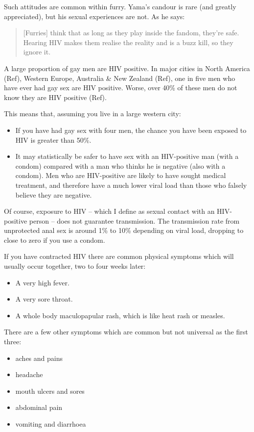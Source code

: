 Such attitudes are common within furry. Yama's candour is rare (and greatly appreciated), but his sexual experiences are not. As he says:

\begin{quote}
  [Furries] think that as long as they play inside the fandom, they're safe. Hearing HIV makes them realise the reality and is a buzz kill, so they ignore it.
\end{quote}

A large proportion of gay men are HIV positive. In major cities in North America (Ref), Western Europe, Australia \& New Zealand (Ref), one in five men who have ever had gay sex are HIV positive. Worse, over 40\% of these men do not know they are HIV positive (Ref).

This means that, assuming you live in a large western city:

\begin{itemize}
  \item If you have had gay sex with four men, the chance you have been exposed to HIV is greater than 50\%.
  \item It may statistically be safer to have sex with an HIV-positive man (with a condom) compared with a man who thinks he is negative (also with a condom). Men who are HIV-positive are likely to have sought medical treatment, and therefore have a much lower viral load than those who falsely believe they are negative.
\end{itemize}

Of course, exposure to HIV – which I define as sexual contact with an HIV-positive person – does not guarantee transmission. The transmission rate from unprotected anal sex is around 1\% to 10\% depending on viral load, dropping to close to zero if you use a condom.

If you have contracted HIV there are common physical symptoms which will usually occur together, two to four weeks later:

\begin{itemize}
  \item A very high fever.
  \item A very sore throat.
  \item A whole body maculopapular rash, which is like heat rash or measles.
\end{itemize}

There are a few other symptoms which are common but not universal as the first three:

\begin{itemize}
  \item aches and pains
  \item headache
  \item mouth ulcers and sores
  \item abdominal pain
  \item vomiting and diarrhoea
\end{itemize}

